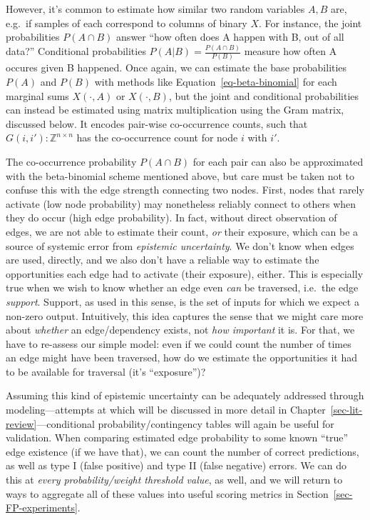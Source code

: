 \documentclass[%
	12pt,
		oneside,
		letterpaper
]{book}
\begin{document}
However, it's common to estimate how similar two random variables
\(A,B\) are, e.g.~if samples of each correspond to columns of binary
\(X\). For instance, the joint probabilities \(P(A\cap B)\) answer ``how
often does A happen with B, out of all data?'' Conditional probabilities
\(P(A|B)=\frac{P(A\cap B)}{P(B)}\) measure how often A occures given B
happened. Once again, we can estimate the base probabilities \(P(A)\)
and \(P(B)\) with methods like Equation~\ref{eq-beta-binomial} for each
marginal sums \(X(\cdot,A)\) or \(X(\cdot,B)\), but the joint and
conditional probabilities can instead be estimated using matrix
multiplication using the Gram matrix, discussed below. It encodes
pair-wise co-occurrence counts, such that
\(G(i,i'):\mathbb{Z}^{n\times n}\) has the co-occurrence count for node
\(i\) with \(i'\).

The co-occurrence probability \(P(A\cap B)\) for each pair can also be
approximated with the beta-binomial scheme mentioned above, but care
must be taken not to confuse this with the edge strength connecting two
nodes. First, nodes that rarely activate (low node probability) may
nonetheless reliably connect to others when they do occur (high edge
probability). In fact, without direct observation of edges, we are not
able to estimate their count, \emph{or} their exposure, which can be a
source of systemic error from \emph{epistemic uncertainty}. We don't
know when edges are used, directly, and we also don't have a reliable
way to estimate the opportunities each edge had to activate (their
exposure), either. This is especially true when we wish to know whether
an edge even \emph{can} be traversed, i.e.~the edge \emph{support}.
Support, as used in this sense, is the set of inputs for which we expect
a non-zero output. Intuitively, this idea captures the sense that we
might care more about \emph{whether} an edge/dependency exists, not
\emph{how important} it is. For that, we have to re-assess our simple
model: even if we could count the number of times an edge might have
been traversed, how do we estimate the opportunities it had to be
available for traversal (it's ``exposure'')?

Assuming this kind of epistemic uncertainty can be adequately addressed
through modeling---attempts at which will be discussed in more detail in
Chapter~\ref{sec-lit-review}---conditional probability/contingency
tables will again be useful for validation. When comparing estimated
edge probability to some known ``true'' edge existence (if we have
that), we can count the number of correct predictions, as well as type I
(false positive) and type II (false negative) errors. We can do this at
\emph{every probability/weight threshold value}, as well, and we will
return to ways to aggregate all of these values into useful scoring
metrics in Section~\ref{sec-FP-experiments}.
\end{document}
